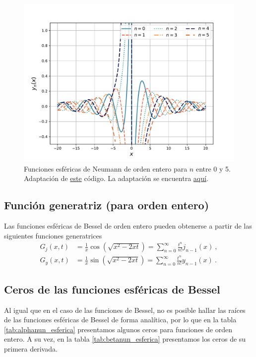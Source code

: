 \begin{figure}[htbp]
    \centering
    \includegraphics[width = 12cm]{Figuras/Bessel-Esferica-second-kind.pdf}
    \caption{Funciones esféricas de Neumann de orden entero para $n$ entre 0 y 5. Adaptación de \href{https://github.com/gfrubi/FM2/blob/master/figuras-editables/fig-Bessel.py}{este} código. La adaptación se encuentra \href{https://github.com/Pedroga-cc/Fisica-Matematica-II/blob/main/Figuras/Plotter_Bessel.py}{aquí}.}
    \label{fig:esferica_bessel_segunda}
\end{figure}

\subsection{Función generatriz (para orden entero)}

Las funciones esféricas de Bessel de orden entero pueden obtenerse a partir de las siguientes funciones generatrices
\begin{align}
    G_j(x,t) & = \frac{1}{x} \cos \left( \sqrt{x^2 - 2xt} \right) = \sum_{n=0}^\infty \frac{t^n}{n!} j_{n-1}(x) \ , \\
    G_y(x,t) & = \frac{1}{x} \sin \left( \sqrt{x^2 - 2xt} \right) = \sum_{n=0}^\infty \frac{t^n}{n!} y_{n-1}(x) \ .
\end{align} 

\subsection{Ceros de las funciones esféricas de Bessel}

Al igual que en el caso de las funciones de Bessel, no es posible hallar las raíces de las funciones esféricas de Bessel de forma analítica, por lo que en la tabla \ref{tab:alphanun_esferica} presentamos algunos ceros para funciones de orden entero. A su vez, en la tabla \ref{tab:betanun_esferica} presentamos los ceros de su primera derivada.

